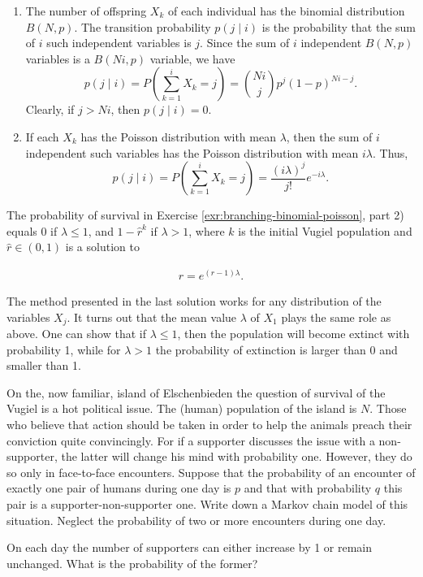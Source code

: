 \begin{Solution}
\begin{enumerate}
\item The number of offspring $X_k$ of each individual has the binomial distribution $B(N, p)$. The transition probability $p(j \mid i)$ is the probability that the sum of $i$ such independent variables is $j$. Since the sum of $i$ independent $B(N, p)$ variables is a $B(Ni, p)$ variable, we have
\[
p(j \mid i) = P\left( \sum_{k=1}^i X_k = j \right) = \binom{Ni}{j} p^j (1-p)^{Ni-j}.
\]
Clearly, if $j > Ni$, then $p(j \mid i) = 0$.
\item If each $X_k$ has the Poisson distribution with mean $\lambda$, then the sum of $i$ independent such variables has the Poisson distribution with mean $i\lambda$. Thus,
\[
p(j \mid i) = P\left( \sum_{k=1}^i X_k = j \right) = \frac{(i\lambda)^j}{j!} e^{-i\lambda}.
\]
\end{enumerate}
\end{Solution}

\begin{Proposition}
\label{prp:survival-probability}
The probability of survival in Exercise \ref{exr:branching-binomial-poisson}, part 2) equals 0 if $\lambda \leq 1$, and $1 - \hat{r}^k$ if $\lambda > 1$, where $k$ is the initial Vugiel population and $\hat{r}\in(0,1)$ is a solution to

\begin{align}
r = e^{(r-1)\lambda}. \tag{5.28}
\end{align}
\end{Proposition}

\begin{Remark}
\label{rem:branching-mean-lambda}
The method presented in the last solution works for any distribution of the variables $X_j$. It turns out that the mean value $\lambda$ of $X_1$ plays the same role as above. One can show that if $\lambda \leq 1$, then the population will become extinct with probability 1, while for $\lambda > 1$ the probability of extinction is larger than 0 and smaller than 1.
\end{Remark}

\begin{Exercise}
\label{exr: Elschenbieden}
On the, now familiar, island of Elschenbieden the question of survival of the Vugiel is a hot political issue. The (human) population of the island is $N$. Those who believe that action should be taken in order to help the animals preach their conviction quite convincingly. For if a supporter discusses the issue with a non-supporter, the latter will change his mind with probability one. However, they do so only in face-to-face encounters. Suppose that the probability of an encounter of exactly one pair of humans during one day is $p$ and that with probability $q$ this pair is a supporter-non-supporter one. Write down a Markov chain model of this situation. Neglect the probability of two or more encounters during one day.

\begin{hint}
On each day the number of supporters can either increase by 1 or remain unchanged. What is the probability of the former?
\end{hint}
\end{Exercise}

